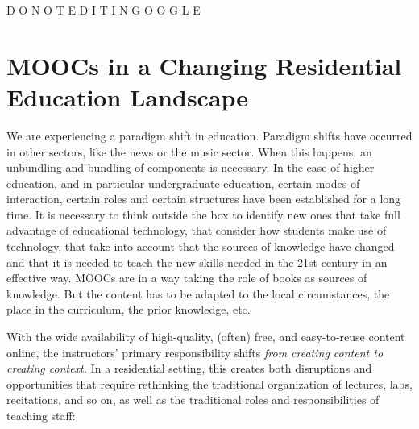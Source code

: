 

     D O    N O T    E D I T      I N      G O O G L E




\section{MOOCs in a Changing Residential Education Landscape}



We are experiencing a paradigm shift in education. Paradigm shifts have
occurred in other sectors, like the news or the music sector. When this
happens, an unbundling and bundling of components is necessary. In the
case of higher education, and in particular undergraduate education,
certain modes of interaction, certain roles and certain structures have
been established for a long time. It is necessary to think outside the
box to identify new ones that take full advantage of educational
technology, that consider how students make use of technology, that take
into account that the sources of knowledge have changed and that it is
needed to teach the new skills needed in the 21st century in an
effective way. MOOCs are in a way taking the role of books as sources of
knowledge. But the content has to be adapted to the local circumstances,
the place in the curriculum, the prior knowledge, etc.

With the wide availability of high-quality, (often) free, and
easy-to-reuse content online, the instructors' primary responsibility
shifts \emph{from creating content to creating context.} 
In a residential setting,
this creates both disruptions and opportunities that require rethinking
the traditional organization of lectures, labs, recitations, and so on, as
well as the traditional roles and responsibilities of teaching staff:

